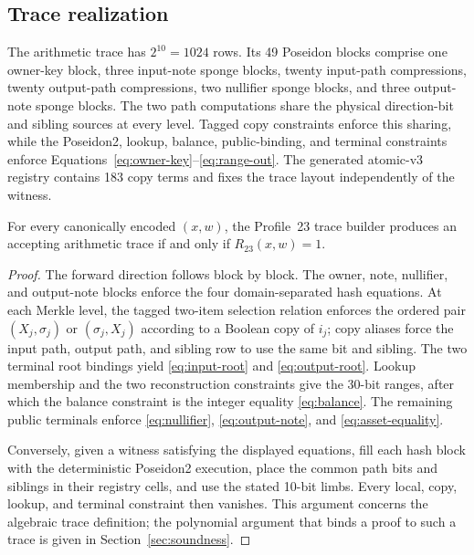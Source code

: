 \subsection{Trace realization}

The arithmetic trace has \(2^{10}=1024\) rows.  Its 49 Poseidon blocks comprise
one owner-key block, three input-note sponge blocks, twenty input-path
compressions, twenty output-path compressions, two nullifier sponge blocks,
and three output-note sponge blocks.  The two
path computations share the physical direction-bit and sibling sources at
every level.  Tagged copy constraints enforce this sharing, while the
Poseidon2, lookup, balance, public-binding, and terminal constraints enforce
Equations~\eqref{eq:owner-key}--\eqref{eq:range-out}.  The generated atomic-v3
registry contains 183 copy terms and fixes the trace layout independently of
the witness.

\begin{proposition}
\label{prop:relation-realization}
For every canonically encoded \((x,w)\), the Profile~23 trace builder produces
an accepting arithmetic trace if and only if \(R_{23}(x,w)=1\).
\end{proposition}

\begin{proof}
The forward direction follows block by block.  The owner, note, nullifier,
and output-note blocks enforce the four domain-separated hash equations.  At
each Merkle level, the tagged two-item selection relation enforces the ordered
pair \((X_j,\sigma_j)\) or \((\sigma_j,X_j)\) according to a Boolean copy of
\(i_j\); copy aliases force the input path, output path, and sibling row to use
the same bit and sibling.  The two terminal root bindings yield
\eqref{eq:input-root} and \eqref{eq:output-root}.  Lookup membership and the
two reconstruction constraints give the 30-bit ranges, after which the
balance constraint is the integer equality \eqref{eq:balance}.  The remaining
public terminals enforce \eqref{eq:nullifier}, \eqref{eq:output-note}, and
\eqref{eq:asset-equality}.

Conversely, given a witness satisfying the displayed equations, fill each
hash block with the deterministic Poseidon2 execution, place the common path
bits and siblings in their registry cells, and use the stated 10-bit limbs.
Every local, copy, lookup, and terminal constraint then vanishes.  This
argument concerns the algebraic trace definition; the polynomial argument
that binds a proof to such a trace is given in Section~\ref{sec:soundness}.
\end{proof}

